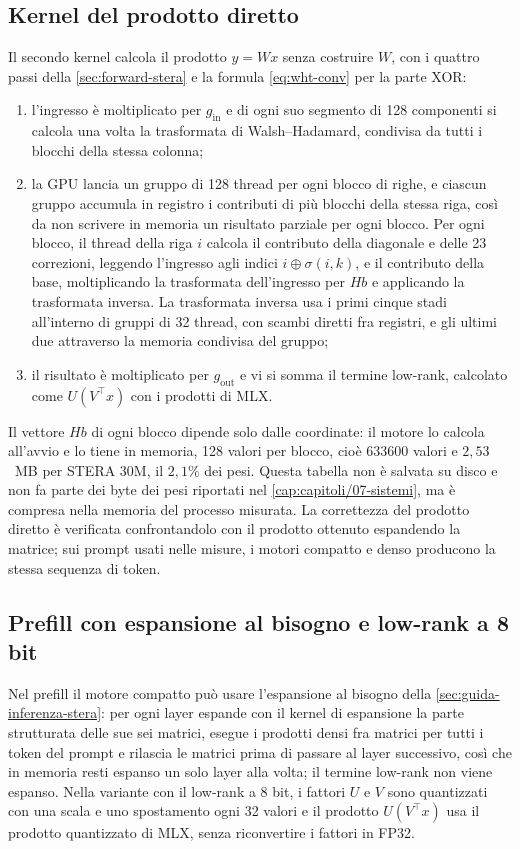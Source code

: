 \subsection{Kernel del prodotto diretto}
Il secondo kernel calcola il prodotto $y=Wx$ senza costruire $W$, con i quattro passi della \autoref{sec:forward-stera} e la formula \eqref{eq:wht-conv} per la parte XOR:
\begin{enumerate}
\item l'ingresso è moltiplicato per $g_{\mathrm{in}}$ e di ogni suo segmento di 128 componenti si calcola una volta la trasformata di Walsh--Hadamard, condivisa da tutti i blocchi della stessa colonna;
\item la GPU lancia un gruppo di 128 thread per ogni blocco di righe, e ciascun gruppo accumula in registro i contributi di più blocchi della stessa riga, così da non scrivere in memoria un risultato parziale per ogni blocco. Per ogni blocco, il thread della riga $i$ calcola il contributo della diagonale e delle 23 correzioni, leggendo l'ingresso agli indici $i\oplus\sigma(i,k)$, e il contributo della base, moltiplicando la trasformata dell'ingresso per $Hb$ e applicando la trasformata inversa. La trasformata inversa usa i primi cinque stadi all'interno di gruppi di 32 thread, con scambi diretti fra registri, e gli ultimi due attraverso la memoria condivisa del gruppo;
\item il risultato è moltiplicato per $g_{\mathrm{out}}$ e vi si somma il termine low-rank, calcolato come $U(V^\top x)$ con i prodotti di MLX.
\end{enumerate}
Il vettore $Hb$ di ogni blocco dipende solo dalle coordinate: il motore lo calcola all'avvio e lo tiene in memoria, 128 valori per blocco, cioè \num{633600} valori e $2{,}53$~MB per STERA 30M, il $2{,}1\%$ dei pesi. Questa tabella non è salvata su disco e non fa parte dei byte dei pesi riportati nel \autoref{cap:capitoli/07-sistemi}, ma è compresa nella memoria del processo misurata. La correttezza del prodotto diretto è verificata confrontandolo con il prodotto ottenuto espandendo la matrice; sui prompt usati nelle misure, i motori compatto e denso producono la stessa sequenza di token.

\subsection{Prefill con espansione al bisogno e low-rank a 8 bit}
Nel prefill il motore compatto può usare l'espansione al bisogno della \autoref{sec:guida-inferenza-stera}: per ogni layer espande con il kernel di espansione la parte strutturata delle sue sei matrici, esegue i prodotti densi fra matrici per tutti i token del prompt e rilascia le matrici prima di passare al layer successivo, così che in memoria resti espanso un solo layer alla volta; il termine low-rank non viene espanso. Nella variante con il low-rank a 8 bit, i fattori $U$ e $V$ sono quantizzati con una scala e uno spostamento ogni 32 valori e il prodotto $U(V^\top x)$ usa il prodotto quantizzato di MLX, senza riconvertire i fattori in FP32.

